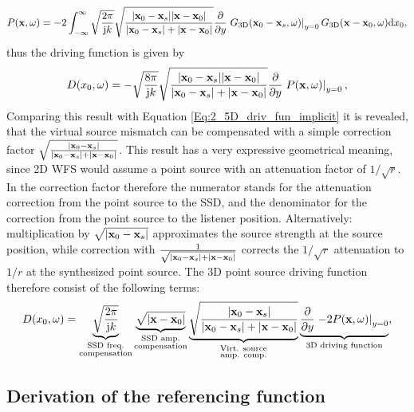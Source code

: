 \begin{equation}
P(\mathbf{x},\omega) = -2 \int_{-\infty}^{\infty}  \sqrt{\frac{2\pi}{\mathrm{j} k}}\sqrt{\frac{| \mathbf{x}_0 - \mathbf{x}_s | | \mathbf{x} - \mathbf{x}_0|  }{| \mathbf{x}_0 - \mathbf{x}_s | + | \mathbf{x} - \mathbf{x}_0| }} \frac{\partial}{\partial y} \left. G_{3\mathrm{D}}(\mathbf{x}_0 - \mathbf{x}_s,\omega) \right|_{y = 0}   G_{3\mathrm{D}}(\mathbf{x} - \mathbf{x}_0,\omega) \mathrm{d} x_0,
\end{equation}
thus the driving function is given by
\begin{equation}
D(x_0,\omega) = 
- \sqrt{\frac{8\pi}{\mathrm{j} k}} \sqrt{\frac{| \mathbf{x}_0 - \mathbf{x}_s | | \mathbf{x} - \mathbf{x}_0|  }{| \mathbf{x}_0 - \mathbf{x}_s | + | \mathbf{x} - \mathbf{x}_0| }} \frac{\partial}{\partial y} \left. P(\mathbf{x},\omega) \right|_{y = 0},
\label{Eq:2_5D_point_source_implicit_df}
\end{equation}
Comparing this result with Equation \eqref{Eq:2_5D_driv_fun_implicit} it is revealed, that the virtual source mismatch can be compensated with a simple correction factor $\sqrt{\frac{| \mathbf{x}_0 - \mathbf{x}_s |  }{| \mathbf{x}_0 - \mathbf{x}_s | + | \mathbf{x} - \mathbf{x}_0| }}$. This result has a very expressive geometrical meaning, since 2D WFS would assume a point source with an attenuation factor of $1/\sqrt{r}$. In the correction factor therefore the numerator stands for the attenuation correction from the point source to the SSD, and the denominator for the correction from the point source to the listener position. Alternatively: multiplication by $\sqrt{| \mathbf{x}_0 - \mathbf{x}_s |}$ approximates the source strength at the source position, while correction with $\frac{1}{\sqrt{| \mathbf{x}_0 - \mathbf{x}_s | + | \mathbf{x} - \mathbf{x}_0| }}$ corrects the $1/\sqrt{r}$ attenuation to $1/r$ at the synthesized point source.
The 3D point source driving function therefore consist of the following terms:
\begin{equation}
D(x_0,\omega) = 
\underbrace{\sqrt{\frac{2\pi}{\mathrm{j} k}}}_{\substack{\text{SSD freq.}\\\text{compensation}}} 
\underbrace{\sqrt{ | \mathbf{x} - \mathbf{x}_0|}}_{\substack{\text{SSD amp.}\\\text{compensation}}} 
\underbrace{\sqrt{\frac{| \mathbf{x}_0 - \mathbf{x}_s |  }{| \mathbf{x}_0 - \mathbf{x}_s | + | \mathbf{x} - \mathbf{x}_0| }}  }_
{\substack{\text{Virt. source}\\\text{amp. comp.}}}
\underbrace{ \frac{\partial}{\partial y} \left. -2 P(\mathbf{x},\omega) \right|_{y = 0}}_{\text{3D driving function}},
\end{equation}

\subsection{Derivation of the referencing function}

